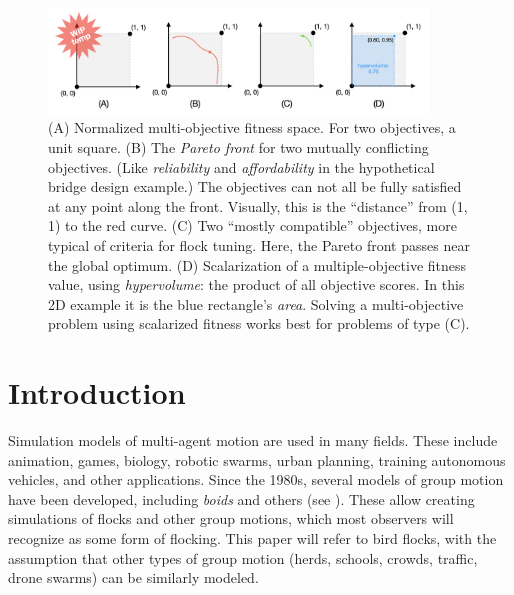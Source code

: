 \documentclass[letterpaper]{article}
\begin{document}


\begin{figure}[]
    \centering
    \includegraphics[width=0.9\textwidth]{images/temp_MOF_HV.png}
    \caption{(A) Normalized multi-objective fitness space. For two objectives, a unit square. (B) The \textit{Pareto front} for two mutually conflicting objectives. (Like \textit{reliability} and \textit{affordability} in the hypothetical bridge design example.) The objectives can not all be fully satisfied at any point along the front. Visually, this is the ``distance'' from (1, 1) to the red curve. (C) Two ``mostly compatible'' objectives, more typical of criteria for flock tuning. Here, the Pareto front passes near the global optimum. (D) Scalarization of a multiple-objective fitness value, using \textit{hypervolume}: the product of all objective scores. In this 2D example it is the blue rectangle's \textit{area}. Solving a multi-objective problem using scalarized fitness works best for problems of type (C).}
    \label{fig:MOF_HV}
\end{figure}


\section{Introduction}
\label{sec:intro}

Simulation models of multi-agent motion are used in many fields. These include animation, games, biology, robotic swarms, urban planning, training autonomous vehicles, and other applications. Since the 1980s, several models of group motion have been developed, including \textit{boids} and others (see ). These allow creating simulations of flocks and other group motions, which most observers will recognize as some form of flocking. This paper will refer to bird flocks, with the assumption that other types of group motion (herds, schools, crowds, traffic, drone swarms) can be similarly modeled.
\end{document}
